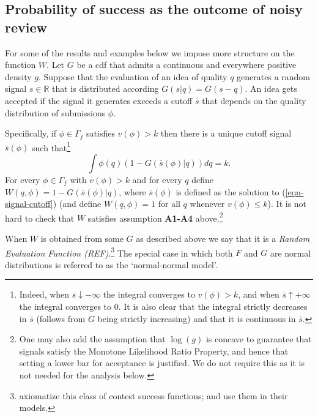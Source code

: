 \documentclass[12pt]{article}
\theoremstyle{plain}
\theoremstyle{definition}
\theoremstyle{remark}
\def\RR{\mathbb{R}}
\begin{document}
\subsection{Probability of success as the outcome of noisy review}\label{subsec-noisy-review}

For some of the results and examples below we impose more structure on the function $W$. Let $G$ be a cdf that admits a continuous and everywhere positive density $g$. Suppose that the evaluation of an idea of quality $q$ generates a random signal $s\in \RR$ that is distributed according $G(s|q)=G(s-q)$. An idea gets accepted if the signal it generates exceeds a cutoff $\bar s$ that depends on the quality distribution of submissions $\phi$. 
 
Specifically, if $\phi\in \Gamma_f$ satisfies $v(\phi)>k$ then there is a unique cutoff signal $\bar s(\phi)$ such that\footnote{Indeed, when $\bar s \downarrow -\infty$ the integral converges to $v(\phi)>k$, and when $\bar s \uparrow +\infty$ the integral converges to $0$. It is also clear that the integral strictly decreases in $\bar s$ (follows from $G$ being strictly increasing) and that it is continuous in $\bar s$.}
\begin{equation}\label{eqn-signal-cutoff}
    \int \phi(q) (1-G(\bar s(\phi)|q)) dq =k.
\end{equation}
For every $\phi\in \Gamma_f$ with $v(\phi)>k$ and for every $q$ define $W(q,\phi) = 1-G(\bar s(\phi)|q)$, where $\bar s(\phi)$ is defined as the solution to (\ref{eqn-signal-cutoff}) (and define $W(q,\phi) =1$ for all $q$ whenever $v(\phi)\le k$). It is not hard to check that $W$ satisfies assumption \textbf{A1-A4} above.\footnote{One may also add the assumption that $\log(g)$ is concave to guarantee that signals satisfy the Monotone Likelihood Ratio Property, and hence that setting a lower bar for acceptance is justified. We do not require this as it is not needed for the analysis below.} 

When $W$ is obtained from some $G$ as described above we say that it is a \emph{Random Evaluation Function (REF)}.\footnote{\citet{azrieli2024success} axiomatize this class of contest success functions; \citet{morgan2018ponds} and \citet{adda2024grantmaking} use them in their models.}  The special case in which both $F$ and $G$ are normal distributions is referred to as the `normal-normal model'.

\end{document}
